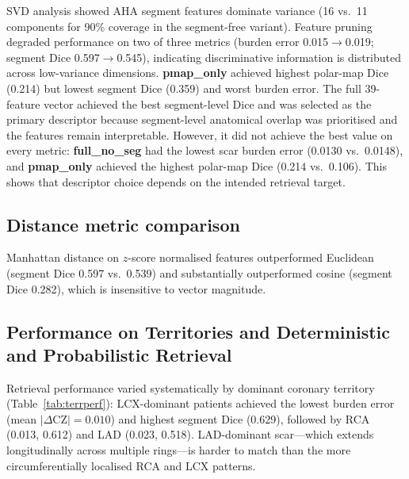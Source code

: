 SVD analysis showed AHA segment features dominate variance (16 vs.\ 11 components for
90\% coverage in the segment-free variant). Feature pruning degraded performance on two
of three metrics (burden error 0.015$\to$0.019; segment Dice 0.597$\to$0.545), indicating
discriminative information is distributed across low-variance dimensions.
\textbf{pmap\_only} achieved highest polar-map Dice (0.214) but lowest segment Dice (0.359)
and worst burden error. The full 39-feature vector achieved the best segment-level Dice and
was selected as the primary descriptor because segment-level anatomical overlap was
prioritised and the features remain interpretable. However, it did not achieve the best value
on every metric: \textbf{full\_no\_seg} had the lowest scar burden error (0.0130
vs.\ 0.0148), and \textbf{pmap\_only} achieved the highest polar-map Dice (0.214
vs.\ 0.106). This shows that descriptor choice depends on the intended retrieval target.

\vspace{-0.8em}
\subsection{Distance metric comparison}

Manhattan distance on $z$-score normalised features outperformed Euclidean (segment Dice
0.597 vs.\ 0.539) and substantially outperformed cosine (segment Dice 0.282), which is
insensitive to vector magnitude.

\subsection{Performance on Territories and Deterministic and Probabilistic Retrieval}

Retrieval performance varied systematically by dominant coronary territory
(Table~\ref{tab:terrperf}): LCX-dominant patients achieved the lowest burden error
(mean $|\Delta\text{CZ}| = 0.010$) and highest segment Dice (0.629), followed by RCA
(0.013, 0.612) and LAD (0.023, 0.518). LAD-dominant scar---which extends longitudinally
across multiple rings---is harder to match than the more circumferentially localised RCA
and LCX patterns.

